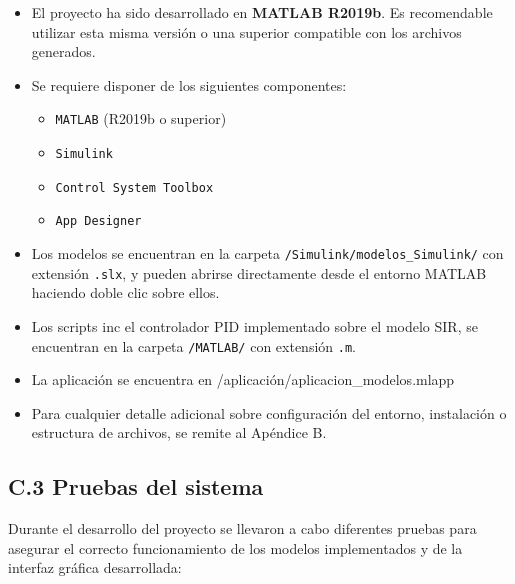 \begin{itemize}
    \item El proyecto ha sido desarrollado en \textbf{MATLAB R2019b}. Es recomendable utilizar esta misma versión o una superior compatible con los archivos generados.

    \item Se requiere disponer de los siguientes componentes:
    \begin{itemize}
        \item \texttt{MATLAB} (R2019b o superior)
        \item \texttt{Simulink}
        \item \texttt{Control System Toolbox}
        \item \texttt{App Designer}
    \end{itemize}

    \item Los modelos se encuentran en la carpeta  \texttt{/Simulink/modelos\_Simulink/} con extensión \texttt{.slx}, y pueden abrirse directamente desde el entorno MATLAB haciendo doble clic sobre ellos.

    \item Los scripts inc el controlador PID implementado sobre el modelo SIR, se encuentran en la carpeta \texttt{/MATLAB/} con extensión \texttt{.m}.

    \item La aplicación se encuentra en 
    {/aplicación/aplicacion\_modelos.mlapp}
    
    \item Para cualquier detalle adicional sobre configuración del entorno, instalación o estructura de archivos, se remite al Apéndice B.
\end{itemize}

\subsection{C.3 Pruebas del sistema}
Durante el desarrollo del proyecto se llevaron a cabo diferentes pruebas para asegurar el correcto funcionamiento de los modelos implementados y de la interfaz gráfica desarrollada:

